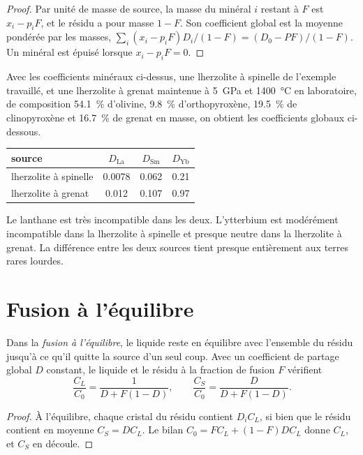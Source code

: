 \begin{proof}
Par unité de masse de source, la masse du minéral $i$ restant à $F$ est $x_i - p_iF$,
et le résidu a pour masse $1 - F$. Son coefficient global est la moyenne pondérée par les
masses, $\sum_i (x_i - p_iF)D_i/(1 - F) = (D_0 - PF)/(1 - F)$. Un minéral est
épuisé lorsque $x_i - p_iF = 0$.
\end{proof}

Avec les coefficients minéraux ci-dessus, une lherzolite à spinelle de l'exemple
travaillé, et une lherzolite à grenat maintenue à \qty{5}{GPa} et
\qty{1400}{\celsius} en laboratoire, de composition \qty{54.1}{\percent} d'olivine,
\qty{9.8}{\percent} d'orthopyroxène, \qty{19.5}{\percent} de clinopyroxène et
\qty{16.7}{\percent} de grenat en masse, on obtient les coefficients globaux ci-dessous.
\begin{center}
\small
\begin{tabular}{lccc}
\hline
source & $D_{\mathrm{La}}$ & $D_{\mathrm{Sm}}$ & $D_{\mathrm{Yb}}$ \\
\hline
lherzolite à spinelle & 0.0078 & 0.062 & 0.21 \\
lherzolite à grenat & 0.012 & 0.107 & 0.97 \\
\hline
\end{tabular}
\end{center}
Le lanthane est très incompatible dans les deux. L'ytterbium est modérément incompatible
dans la lherzolite à spinelle et presque neutre dans la lherzolite à grenat. La
différence entre les deux sources tient presque entièrement aux terres rares
lourdes.

\section{Fusion à l'équilibre}\label{sec:b3:trace-element-modelling:batch}

\begin{theorem}\label{thm:b3:trace-element-modelling:batch}
Dans la \emph{fusion à l'équilibre}, le liquide reste en équilibre
avec l'ensemble du résidu jusqu'à ce qu'il quitte la source d'un seul coup. Avec un coefficient
de partage global $D$ constant, le liquide et le résidu à la fraction de fusion $F$
vérifient
\[
\frac{C_L}{C_0} = \frac{1}{D + F(1 - D)}, \qquad
\frac{C_S}{C_0} = \frac{D}{D + F(1 - D)}.
\]
\end{theorem}

\begin{proof}
À l'équilibre, chaque cristal du résidu contient $D_iC_L$, si bien que le
résidu contient en moyenne $C_S = DC_L$. Le bilan $C_0 = FC_L + (1 - F)DC_L$ donne
$C_L$, et $C_S$ en découle.
\end{proof}

